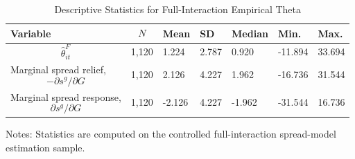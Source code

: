 \begin{table}[H]\centering
\begin{threeparttable}
\caption{Descriptive Statistics for Full-Interaction Empirical Theta}
\label{tab:theta_descriptive_stats}
\scriptsize
\begin{tabularx}{\textwidth}{lYYYYYY}
\toprule
Variable & $$N$$ & Mean & SD & Median & Min. & Max. \\
\midrule
$$\widehat{\theta}^{F}_{it}$$ & 1,120 & 1.224 & 2.787 & 0.920 & -11.894 & 33.694 \\
Marginal spread relief, $$-\partial s^g/\partial G$$ & 1,120 & 2.126 & 4.227 & 1.962 & -16.736 & 31.544 \\
Marginal spread response, $$\partial s^g/\partial G$$ & 1,120 & -2.126 & 4.227 & -1.962 & -31.544 & 16.736 \\
\bottomrule
\end{tabularx}
\begin{tablenotes}[flushleft]\footnotesize
\item Notes: Statistics are computed on the controlled full-interaction spread-model estimation sample.
\end{tablenotes}
\end{threeparttable}
\end{table}
